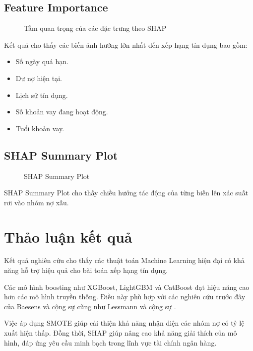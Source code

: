 \subsection{Feature Importance}

\begin{figure}[H]
\centering
\caption{Tầm quan trọng của các đặc trưng theo SHAP}
\end{figure}

Kết quả cho thấy các biến ảnh hưởng lớn nhất đến xếp hạng tín dụng bao gồm:

\begin{itemize}
    \item Số ngày quá hạn.
    \item Dư nợ hiện tại.
    \item Lịch sử tín dụng.
    \item Số khoản vay đang hoạt động.
    \item Tuổi khoản vay.
\end{itemize}

\subsection{SHAP Summary Plot}

\begin{figure}[H]
\centering
\caption{SHAP Summary Plot}
\end{figure}

SHAP Summary Plot cho thấy chiều hướng tác động của từng biến lên xác suất rơi vào nhóm nợ xấu.

\section{Thảo luận kết quả}

Kết quả nghiên cứu cho thấy các thuật toán Machine Learning hiện đại có khả năng hỗ trợ hiệu quả cho bài toán xếp hạng tín dụng.

Các mô hình boosting như XGBoost, LightGBM và CatBoost đạt hiệu năng cao hơn các mô hình truyền thống. Điều này phù hợp với các nghiên cứu trước đây của Baesens và cộng sự \cite{baesens2003benchmarking} cũng như Lessmann và cộng sự \cite{lessmann2015benchmarking}.

Việc áp dụng SMOTE giúp cải thiện khả năng nhận diện các nhóm nợ có tỷ lệ xuất hiện thấp. Đồng thời, SHAP giúp nâng cao khả năng giải thích của mô hình, đáp ứng yêu cầu minh bạch trong lĩnh vực tài chính ngân hàng.

